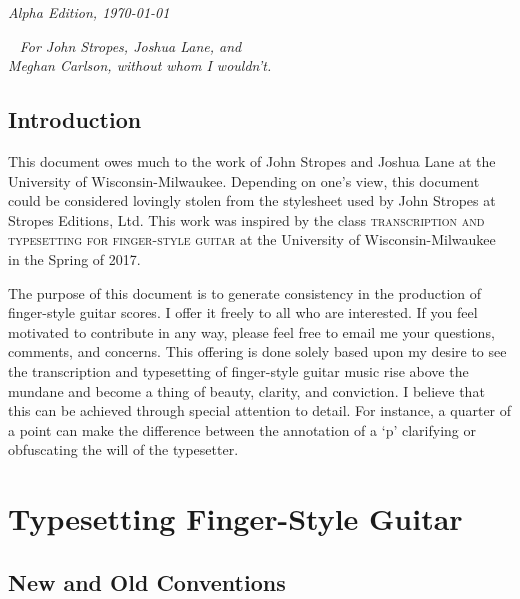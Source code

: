 \documentclass[]{memoir}
\begin{document}
  \par\textit{Alpha Edition, \today}

  \clearpage

\tableofcontents



\listoftables

\clearpage
~\vfill
{\Huge \textit{For John Stropes, Joshua Lane, and}}\\

\vspace*{.15in}
{\Huge \textit{Meghan Carlson, without whom I wouldn't.}}
\vfill
\vfill

\clearpage
\pagestyle{ruled}
\nouppercaseheads

\chapter{Introduction}
This document owes much to the work of John Stropes and Joshua Lane at
the University of Wisconsin-Milwaukee. Depending on one's view, this
document could be considered lovingly stolen from the stylesheet used
by John Stropes at Stropes Editions, Ltd. This work was inspired by
the class \textsc{transcription and typesetting for finger-style
  guitar} at the University of Wisconsin-Milwaukee in the Spring of
2017.

The purpose of this document is to generate consistency in the
production of finger-style guitar scores. I offer it freely to all who
are interested. If you feel motivated to contribute in any way, please
feel free to email me your questions, comments, and concerns. This
offering is done solely based upon my desire to see the transcription
and typesetting of finger-style guitar music rise above the mundane
and become a thing of beauty, clarity, and conviction. I believe that
this can be achieved through special attention to detail. For
instance, a quarter of a point can make the difference between the
annotation of a `\textsf{p}' clarifying or obfuscating the will of the
typesetter.

\mainmatter

\part{Typesetting Finger-Style Guitar}
\label{part:types-fing-style}

\chapter{New and Old Conventions}
\label{cha:new-old-conventions}
\end{document}
